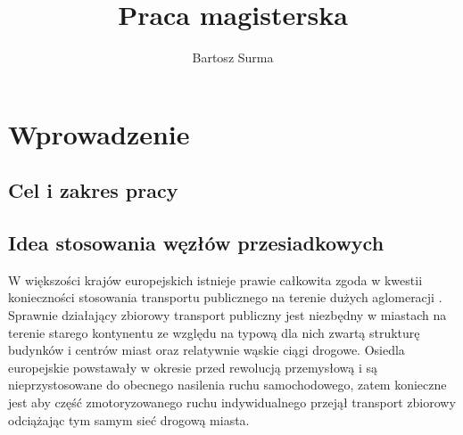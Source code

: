 \documentclass[twoside,12pt]{article}
\title{Praca magisterska}
\author{Bartosz Surma}
\date{}
\newcommand\blankpage{%
    \null
    \thispagestyle{empty}%
    \addtocounter{page}{-1}%
    \newpage}
\begin{document}

%
	
	\blankpage
	\addtocounter{page}{-1}
	\tableofcontents
	\clearpage
	\pagestyle{fancy}

\newcommand{\pnr}{,,Park and Ride''}
\newcommand{\obraz}[4]{	
	\begin{figure}[H]
		\centering
		\caption{#1}
		\texttt{[image: \#2]}\\
		\footnotesize{#3}
		{#4}
	\end{figure}
}

\newcommand{\zrodlo}[1]{\scriptsize{(#1)}}

\section{Wprowadzenie}

	\subsection{Cel i zakres pracy}

	\subsection{Idea stosowania węzłów przesiadkowych}
	
	W większości krajów europejskich istnieje prawie całkowita zgoda w kwestii konieczności stosowania transportu publicznego na terenie dużych aglomeracji \cite{guide}. Sprawnie działający zbiorowy transport publiczny jest niezbędny w miastach na terenie starego kontynentu ze względu na typową dla nich zwartą strukturę budynków i centrów miast oraz relatywnie wąskie ciągi drogowe. Osiedla europejskie powstawały w okresie przed rewolucją przemysłową i są nieprzystosowane do obecnego nasilenia ruchu samochodowego, zatem konieczne jest aby część zmotoryzowanego ruchu indywidualnego przejął transport zbiorowy odciążając tym samym sieć drogową miasta. 
	
\end{document}
